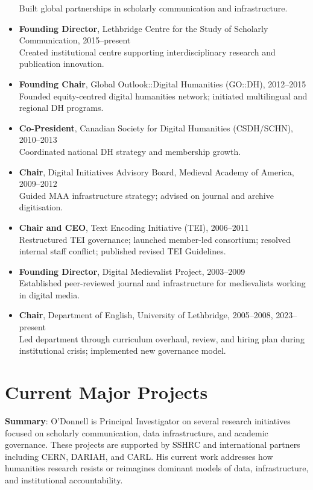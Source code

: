 \documentclass[12pt]{article}
\begin{document}
\begin{itemize}
  Built global partnerships in scholarly communication and infrastructure.
  \item \textbf{Founding Director}, Lethbridge Centre for the Study of Scholarly Communication, 2015–present\\
  Created institutional centre supporting interdisciplinary research and publication innovation.
  \item \textbf{Founding Chair}, Global Outlook::Digital Humanities (GO::DH), 2012–2015\\
  Founded equity-centred digital humanities network; initiated multilingual and regional DH programs.
  \item \textbf{Co-President}, Canadian Society for Digital Humanities (CSDH/SCHN), 2010–2013\\
  Coordinated national DH strategy and membership growth.
  \item \textbf{Chair}, Digital Initiatives Advisory Board, Medieval Academy of America, 2009–2012\\
  Guided MAA infrastructure strategy; advised on journal and archive digitisation.
  \item \textbf{Chair and CEO}, Text Encoding Initiative (TEI), 2006–2011\\
  Restructured TEI governance; launched member-led consortium; resolved internal staff conflict; published revised TEI Guidelines.
  \item \textbf{Founding Director}, Digital Medievalist Project, 2003–2009\\
  Established peer-reviewed journal and infrastructure for medievalists working in digital media.
  \item \textbf{Chair}, Department of English, University of Lethbridge, 2005–2008, 2023–present\\
  Led department through curriculum overhaul, review, and hiring plan during institutional crisis; implemented new governance model.
\end{itemize}

\section*{Current Major Projects}

\textbf{Summary}: O'Donnell is Principal Investigator on several research initiatives focused on scholarly communication, data infrastructure, and academic governance. These projects are supported by SSHRC and international partners including CERN, DARIAH, and CARL. His current work addresses how humanities research resists or reimagines dominant models of data, infrastructure, and institutional accountability.
\end{document}
